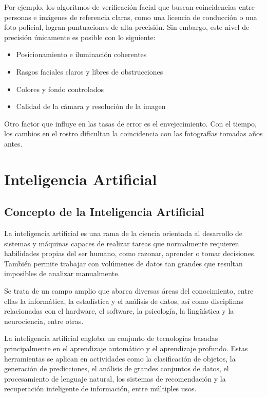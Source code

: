 Por ejemplo, los algoritmos de verificación facial que buscan coincidencias
entre personas e imágenes de referencia claras, como una licencia de conducción
o una foto policial, logran puntuaciones de alta precisión. Sin embargo, este
nivel de precisión únicamente es posible con lo siguiente:


\begin{itemize}
  \item Posicionamiento e iluminación coherentes
  \item Rasgos faciales claros y libres de obstrucciones
  \item Colores y fondo controlados
  \item Calidad de la cámara y resolución de la imagen
\end{itemize}

Otro factor que influye en las tasas de error es el envejecimiento. Con el
tiempo, los cambios en el rostro dificultan la coincidencia con las fotografías
tomadas años antes.


\section{Inteligencia Artificial}
\subsection{Concepto de la Inteligencia Artificial}

La inteligencia artificial es una rama de la ciencia orientada al desarrollo de sistemas y máquinas capaces de realizar tareas que normalmente requieren habilidades propias del ser humano, como razonar, aprender o tomar decisiones. También permite trabajar con volúmenes de datos tan grandes que resultan imposibles de analizar manualmente.

Se trata de un campo amplio que abarca diversas áreas del conocimiento, entre ellas la informática, la estadística y el análisis de datos, así como disciplinas relacionadas con el hardware, el software, la psicología, la lingüística y la neurociencia, entre otras.

La inteligencia artificial engloba un conjunto de tecnologías basadas principalmente en el aprendizaje automático y el aprendizaje profundo. Estas herramientas se aplican en actividades como la clasificación de objetos, la generación de predicciones, el análisis de grandes conjuntos de datos, el procesamiento de lenguaje natural, los sistemas de recomendación y la recuperación inteligente de información, entre múltiples usos\cite{aiIBM,techopediaAI}.


